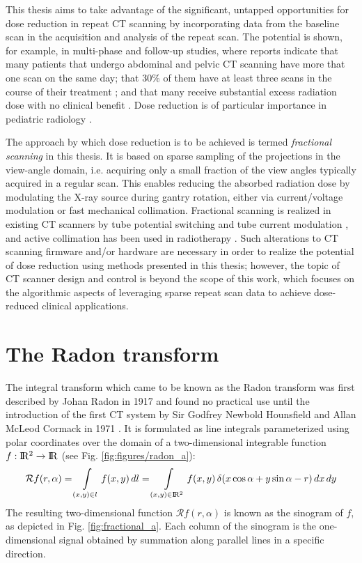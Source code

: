 This thesis aims to take advantage of the significant, untapped opportunities for dose reduction in repeat CT scanning by incorporating data from the baseline scan in the acquisition and analysis of the repeat scan. The potential is shown, for example, in multi-phase and follow-up studies, where reports indicate that many patients that undergo abdominal and pelvic CT scanning have more that one scan on the same day; that 30\% of them have at least three scans in the course of their treatment \cite{davies2011risks}; and that many receive substantial excess radiation dose with no clinical benefit \cite{mettler2000ct}. Dose reduction is of particular importance in pediatric radiology \cite{donnelly2005reducing, chodick2007excess}.

The approach by which dose reduction is to be achieved is termed \textit{fractional scanning} in this thesis. 
It is based on sparse sampling of the projections in the view-angle domain, i.e. acquiring only a small fraction of the view angles typically acquired in a regular scan.
This enables reducing the absorbed radiation dose by modulating the X-ray source during gantry rotation, either via current/voltage modulation or fast mechanical collimation.
Fractional scanning is realized in existing CT scanners by tube potential switching and tube current modulation \cite{kalra2004techniques}, and active collimation has been used in radiotherapy \cite{mackie2006history}.
Such alterations to CT scanning firmware and/or hardware are necessary in order to realize the potential of dose reduction using methods presented in this thesis; however, the topic of CT scanner design and control is beyond the scope of this work, which focuses on the algorithmic aspects of leveraging sparse repeat scan data to achieve dose-reduced clinical applications.

\section{The Radon transform}

The integral transform which came to be known as the Radon transform was first described by Johan Radon in 1917 \cite{radon1917determination} and found no practical use until the introduction of the first CT system by Sir Godfrey Newbold Hounsfield and Allan McLeod Cormack in 1971 \cite{maier2018medical}. It is formulated as line integrals parameterized using polar coordinates over the domain of a two-dimensional integrable function $f: \rm I\!R ^2 \rightarrow \rm I\!R $ (see Fig. \ref{fig:figures/radon_a}):
\begin{equation}
\mathcal{R} f(r, \alpha) 
= \int \displaylimits_{(x,y) \in l} f(x,y)\, dl \\
= \int \displaylimits_{(x,y) \in \rm I\!R ^2} { f(x,y)\, \delta(x \cos \alpha + y \sin \alpha - r)}\, dx\, dy
\end{equation}
The resulting two-dimensional function $\mathcal{R} f(r, \alpha)$ is known as the sinogram of $f$, as depicted in Fig. \ref{fig:fractional_a}. Each column of the sinogram is the one-dimensional signal obtained by summation along parallel lines in a specific direction.

